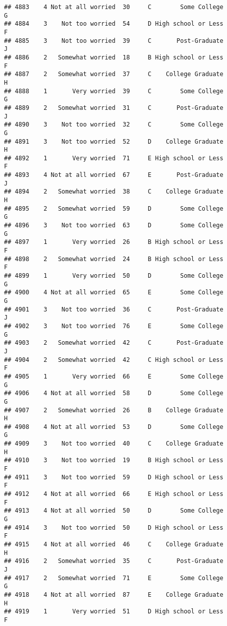 \documentclass[
]{article}
\begin{document}
\begin{verbatim}
## 4883    4 Not at all worried  30     C        Some College         G
## 4884    3    Not too worried  54     D High school or Less         F
## 4885    3    Not too worried  39     C       Post-Graduate         J
## 4886    2   Somewhat worried  18     B High school or Less         F
## 4887    2   Somewhat worried  37     C    College Graduate         H
## 4888    1       Very worried  39     C        Some College         G
## 4889    2   Somewhat worried  31     C       Post-Graduate         J
## 4890    3    Not too worried  32     C        Some College         G
## 4891    3    Not too worried  52     D    College Graduate         H
## 4892    1       Very worried  71     E High school or Less         F
## 4893    4 Not at all worried  67     E       Post-Graduate         J
## 4894    2   Somewhat worried  38     C    College Graduate         H
## 4895    2   Somewhat worried  59     D        Some College         G
## 4896    3    Not too worried  63     D        Some College         G
## 4897    1       Very worried  26     B High school or Less         F
## 4898    2   Somewhat worried  24     B High school or Less         F
## 4899    1       Very worried  50     D        Some College         G
## 4900    4 Not at all worried  65     E        Some College         G
## 4901    3    Not too worried  36     C       Post-Graduate         J
## 4902    3    Not too worried  76     E        Some College         G
## 4903    2   Somewhat worried  42     C       Post-Graduate         J
## 4904    2   Somewhat worried  42     C High school or Less         F
## 4905    1       Very worried  66     E        Some College         G
## 4906    4 Not at all worried  58     D        Some College         G
## 4907    2   Somewhat worried  26     B    College Graduate         H
## 4908    4 Not at all worried  53     D        Some College         G
## 4909    3    Not too worried  40     C    College Graduate         H
## 4910    3    Not too worried  19     B High school or Less         F
## 4911    3    Not too worried  59     D High school or Less         F
## 4912    4 Not at all worried  66     E High school or Less         F
## 4913    4 Not at all worried  50     D        Some College         G
## 4914    3    Not too worried  50     D High school or Less         F
## 4915    4 Not at all worried  46     C    College Graduate         H
## 4916    2   Somewhat worried  35     C       Post-Graduate         J
## 4917    2   Somewhat worried  71     E        Some College         G
## 4918    4 Not at all worried  87     E    College Graduate         H
## 4919    1       Very worried  51     D High school or Less         F

\end{verbatim}
\end{document}
